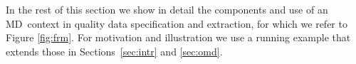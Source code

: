 \documentclass[format=acmsmall, review=false, screen=true]{acmart}
\newcommand{\ignore}[1]{}
\newcommand{\ignoreT}[1]{}
\newcommand{\md}{MD}
\newcommand{\blue}[1]{{#1}}
\newcommand{\comlb}[1]{{\vspace{2mm}\noindent \bf \blue{COMM(LEO):}}~ #1 \hfill {\bf
    END.}\\}
\newcommand{\commos}[1]{{\vspace{2mm}\noindent \bf \blue{COMM(MOSTAFA):}}~ #1 \hfill {\bf
    END.}\\}
\begin{document}

\ignore{\comlb{Are we again repeating figures, tables, etc. that we had before?}
\commos{No redundant repeated Figure or Table here, only Table~\ref{tab:tempq} has the same name as Table~\ref{tab:temperaturesq} from the introduction, but it has different data.}
}

In the rest of this section we show in detail the components and use of an \md \ context in quality data specification and extraction, for which we refer to Figure \ref{fig:frm}. For motivation and illustration we use a running example that extends those  in Sections~\ref{sec:intr} and \ref{sec:omd}.
\ignoreT{\begin{figure}[ht]
\begin{center}
\texttt{[image: ./fig/framework-example]}
 \caption{Categorical relations in context}\label{fig:dim}
\end{center}
\end{figure}}


\end{document}
